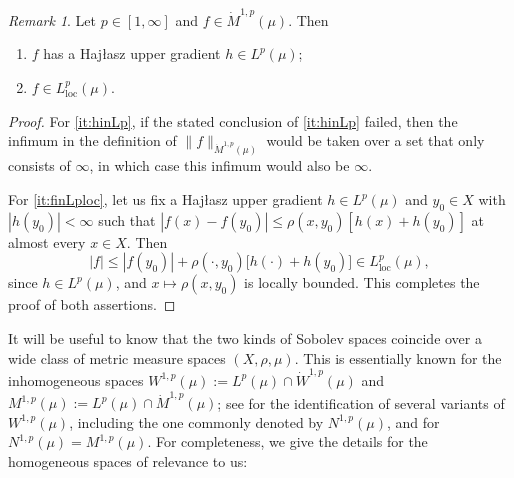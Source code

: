 \documentclass[11pt]{amsart}
\theoremstyle{definition}
\theoremstyle{remark}
\newtheorem{remark}[theorem]{Remark}
\numberwithin{equation}{section}
\newcommand{\abs}[1]{|#1|}
\newcommand{\Norm}[2]{\|#1\|_{#2}}
\begin{document}
\begin{remark}\label{rem:dotM-basic}
Let $p\in[1,\infty]$ and $f\in\dot M^{1,p}(\mu)$. Then
\begin{enumerate}[\rm(i)]
  \item\label{it:hinLp} $f$ has a Haj\l{}asz upper gradient $h\in L^p(\mu)$;
  \item\label{it:finLploc} $f\in L^p_{\mathrm{loc}}(\mu)$.
\end{enumerate}
\end{remark}

\begin{proof}
For \eqref{it:hinLp}, if the stated conclusion of \eqref{it:hinLp} failed, then the infimum in the definition of
$\Norm{f}{\dot M^{1,p}(\mu)}$ would be taken over a set that only consists of $\infty$, in
which case this infimum would also be $\infty$.

For \eqref{it:finLploc}, let us fix a Haj\l{}asz upper gradient $h\in L^p(\mu)$ and $y_0\in
X$ with $\abs{h(y_0)}<\infty$ such that $\abs{f(x)-f(y_0)}\leq\rho(x,y_0)[h(x)+h(y_0)]$ at
almost every $x\in X$. Then
$$\abs{f}\leq\abs{f(y_0)}+\rho(\cdot,y_0)\big[h(\cdot)+h(y_0)\big]\in
L^p_{\mathrm{loc}}(\mu),$$
since $h\in L^p(\mu)$, and $x\mapsto\rho(x,y_0)$ is locally
bounded.
This completes the proof of both assertions.
\end{proof}


It will be useful to know that the two kinds of Sobolev spaces coincide over a wide class of
metric measure spaces $(X,\rho,\mu)$. This is essentially known for the inhomogeneous spaces
$W^{1,p}(\mu):=L^p(\mu)\cap\dot W^{1,p}(\mu)$ and $M^{1,p}(\mu):=L^p(\mu)\cap\dot
M^{1,p}(\mu)$; see \cite[Theorem 7.4]{AGS:13} for the identification of several variants of
$W^{1,p}(\mu)$, including the one commonly denoted by $N^{1,p}(\mu)$, and \cite[Corollary
10.2.9]{HKST:book} for $N^{1,p}(\mu)=M^{1,p}(\mu)$. For completeness, we give the details
for the homogeneous spaces of relevance to us:
\end{document}
